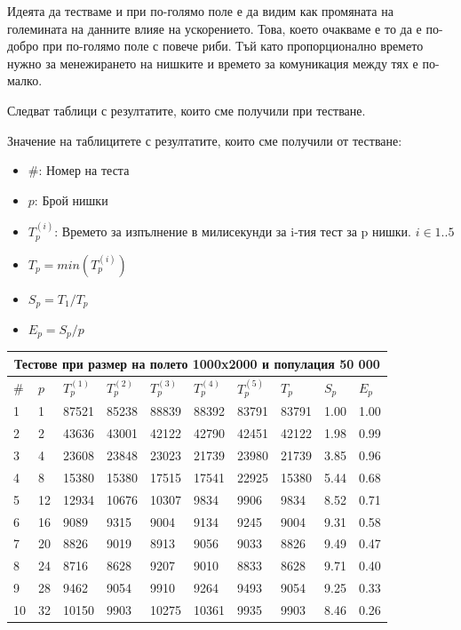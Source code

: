 \documentclass[12pt]{article}
\begin{document}
Идеята да тестваме и при по-голямо поле е да видим как промяната на големината на данните
влияе на ускорението. Това, което очакваме е то да е по-добро при по-голямо поле с повече риби.
Тъй като пропорционално времето нужно за менежирането на нишките и времето за комуникация между тях
е по-малко.

\bigbreak

Следват таблици с резултатите, които сме получили при тестване.

\bigbreak
Значение на таблицитете с резултатите, които сме получили от тестване:
\begin{itemize}
	\item \#: Номер на теста
	\item $p$: Брой нишки
	\item $T^{(i)}_p$: Времето за изпълнение в милисекунди за i-тия тест за p нишки. $i \in 1..5$
	\item $T_p = min(T^{(i)}_p)$
	\item $S_p = T_1 / T_p$
	\item $E_p = S_p / p$
\end{itemize}
\newpage

\begin{tabular}{ |p{0.6cm}||p{1cm}|p{1cm}|p{1cm}|p{1cm}|p{1cm}|p{1cm}|p{1cm}|p{0.9cm}|p{0.9cm}| }
 \hline
 \multicolumn{10}{|c|}{Тестове при размер на полето 1000x2000 и популация 50 000} \\
 \hline
 \# & $p$ & $T^{(1)}_p$ & $T^{(2)}_p$ & $T^{(3)}_p$ & $T^{(4)}_p$ & $T^{(5)}_p$ & $T_p$ & $S_p$ & $E_p$ \\
 \hline
1  & 1  & 87521 & 85238 & 88839 & 88392 & 83791 & 83791 & 1.00 & 1.00 \\
2  & 2  & 43636 &  43001 & 42122 & 42790 & 42451 & 42122 & 1.98 & 0.99 \\
3  & 4  & 23608 & 23848 & 23023 & 21739 & 23980 & 21739 & 3.85 & 0.96 \\
4  & 8  & 15380 & 15380 & 17515 & 17541 & 22925 & 15380 & 5.44 & 0.68 \\
5  & 12 & 12934 & 10676 & 10307 & 9834 & 9906 & 9834 & 8.52 & 0.71 \\
6  & 16 & 9089 & 9315 & 9004 & 9134 & 9245 & 9004 & 9.31 & 0.58 \\
7  & 20 & 8826 & 9019 & 8913 & 9056 & 9033 & 8826 & 9.49 & 0.47 \\
8  & 24 & 8716 & 8628 & 9207 & 9010 & 8833 & 8628 & 9.71 & 0.40 \\
9  & 28 & 9462 & 9054 & 9910 & 9264 & 9493 & 9054 & 9.25 & 0.33 \\
10 & 32 & 10150 & 9903 & 10275 & 10361 & 9935 & 9903 & 8.46 & 0.26 \\
 \hline
\end{tabular}
\end{document}
